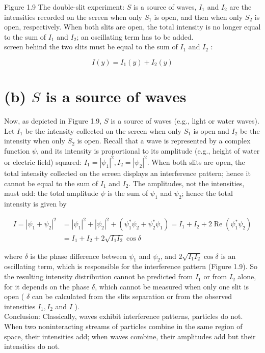 \documentclass[10pt]{article}
\begin{document}
Figure 1.9 The double-slit experiment: $S$ is a source of waves, $I_{1}$ and $I_{2}$ are the intensities recorded on the screen when only $S_{1}$ is open, and then when only $S_{2}$ is open, respectively. When both slits are open, the total intensity is no longer equal to the sum of $I_{1}$ and $I_{2}$; an oscillating term has to be added.\\
screen behind the two slits must be equal to the sum of $I_{1}$ and $I_{2}$ :


\begin{equation*}
I(y)=I_{1}(y)+I_{2}(y) \tag{1.53}
\end{equation*}


\section*{(b) $S$ is a source of waves}
Now, as depicted in Figure 1.9, $S$ is a source of waves (e.g., light or water waves). Let $I_{1}$ be the intensity collected on the screen when only $S_{1}$ is open and $I_{2}$ be the intensity when only $S_{2}$ is open. Recall that a wave is represented by a complex function $\psi$, and its intensity is proportional to its amplitude (e.g., height of water or electric field) squared: $I_{1}=\left|\psi_{1}\right|^{2}, I_{2}=\left|\psi_{2}\right|^{2}$. When both slits are open, the total intensity collected on the screen displays an interference pattern; hence it cannot be equal to the sum of $I_{1}$ and $I_{2}$. The amplitudes, not the intensities, must add: the total amplitude $\psi$ is the sum of $\psi_{1}$ and $\psi_{2}$; hence the total intensity is given by


\begin{align*}
I=\left|\psi_{1}+\psi_{2}\right|^{2} & =\left|\psi_{1}\right|^{2}+\left|\psi_{2}\right|^{2}+\left(\psi_{1}^{*} \psi_{2}+\psi_{2}^{*} \psi_{1}\right)=I_{1}+I_{2}+2 \operatorname{Re}\left(\psi_{1}^{*} \psi_{2}\right) \\
& =I_{1}+I_{2}+2 \sqrt{I_{1} I_{2}} \cos \delta \tag{1.54}
\end{align*}


where $\delta$ is the phase difference between $\psi_{1}$ and $\psi_{2}$, and $2 \sqrt{I_{1} I_{2}} \cos \delta$ is an oscillating term, which is responsible for the interference pattern (Figure 1.9). So the resulting intensity distribution cannot be predicted from $I_{1}$ or from $I_{2}$ alone, for it depends on the phase $\delta$, which cannot be measured when only one slit is open ( $\delta$ can be calculated from the slits separation or from the observed intensities $I_{1}, I_{2}$ and $I$ ).\\
Conclusion: Classically, waves exhibit interference patterns, particles do not. When two noninteracting streams of particles combine in the same region of space, their intensities add; when waves combine, their amplitudes add but their intensities do not.
\end{document}
